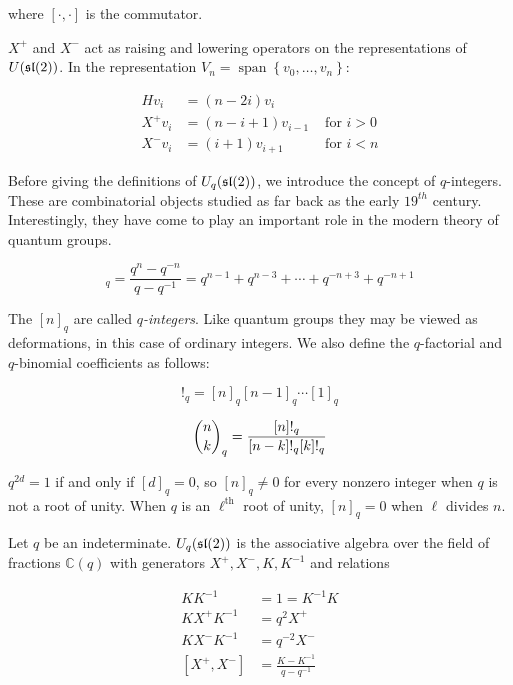 where $[\cdot, \cdot]$ is the commutator.

$X^+$ and $X^-$ act as raising and lowering operators on the representations of
$U(\mathfrak{sl}(2))$. In the representation $V_n = \operatorname{span}\left\{ v_0,
\ldots, v_n \right\}$:

\begin{align}
    H v_i &= (n - 2i) v_i \\
    X^+ v_i &= (n-i+1)v_{i-1} &\text{ for $i > 0$} \\
    X^- v_i &= (i+1)v_{i+1}   &\text{ for $i < n$}  
\end{align}

Before giving the definitions of $U_q(\mathfrak{sl}(2))$, we introduce the concept of
$q$-integers. These are combinatorial objects studied as far back as the early
$19^{th}$ century. Interestingly, they have come to play an important role in
the modern theory of quantum groups. 

\begin{equation}
    [n]_q = \frac{q^n - q^{-n}}{q - q^{-1}} = q^{n-1} + q^{n-3} + \cdots + q^{-n+3} + q^{-n+1}
\end{equation}

The $[n]_q$ are called \emph{$q$-integers}. Like quantum groups they may be
viewed as deformations, in this case of ordinary integers. We also define the
$q$-factorial and $q$-binomial coefficients as follows:

\begin{equation}
    [n]!_q = [n]_q [n-1]_q \cdots [1]_q
\end{equation}

\begin{equation}
    \dbinom{n}{k}_q = \frac{[n]!_q}{[n-k]!_q[k]!_q}
\end{equation}

$q^{2d}=1$ if and only if $[d]_q = 0$, so $[n]_q \neq 0$ for every nonzero
integer when $q$ is not a root of unity. When $q$ is an $\ell^\text{th}$ root
of unity, $[n]_q = 0$ when $\ell$ divides $n$.

\begin{defn}
\label{Uqsl2Def}
Let $q$ be an indeterminate. $U_q(\mathfrak{sl}(2))$ is the associative algebra over the
field of fractions $\mathbb{C}(q)$ with generators $X^+,X^-,K, K^{-1}$ and
relations 

\begin{align}
    KK^{-1} &= 1 = K^{-1}K \\
    K X^+ K^{-1} &= q^2  X^+  \\
    KX^-K^{-1} &= q^{-2} X^- \\
    [ X^+ ,X^-] &= \frac{K - K^{-1}}{q - q^{-1}} \label{equation:hadamard}
\end{align}
\end{defn}

